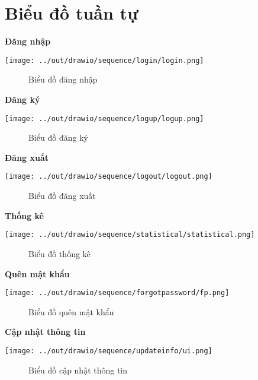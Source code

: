 \section{Biểu đồ tuần tự}

  \textbf{Đăng nhập}
    \begin{center}
      \texttt{[image: ../out/drawio/sequence/login/login.png]}
      \begin{figure}[h]
        \centering
        \caption{Biểu đồ đăng nhập}
      \end{figure}
    \end{center}

  \textbf{Đăng ký}
    \begin{center}
      \texttt{[image: ../out/drawio/sequence/logup/logup.png]}
      \begin{figure}[h]
        \centering
        \caption{Biểu đồ đăng ký}
      \end{figure}
    \end{center}

  \textbf{Đăng xuất}
    \begin{center}
      \texttt{[image: ../out/drawio/sequence/logout/logout.png]}
      \begin{figure}[h]
        \centering
        \caption{Biểu đồ đăng xuất}
      \end{figure}
    \end{center}

  \textbf{Thống kê}
    \begin{center}
      \texttt{[image: ../out/drawio/sequence/statistical/statistical.png]}
      \begin{figure}[h]
        \centering
        \caption{Biểu đồ thống kê}
      \end{figure}
    \end{center}

  \textbf{Quên mật khẩu}
    \begin{center}
      \texttt{[image: ../out/drawio/sequence/forgotpassword/fp.png]}
      \begin{figure}[h]
        \centering
        \caption{Biểu đồ quên mật khẩu}
      \end{figure}
    \end{center}

  \textbf{Cập nhật thông tin}
    \begin{center}
      \texttt{[image: ../out/drawio/sequence/updateinfo/ui.png]}
      \begin{figure}[h]
        \centering
        \caption{Biểu đồ cập nhật thông tin}
      \end{figure}
    \end{center}


